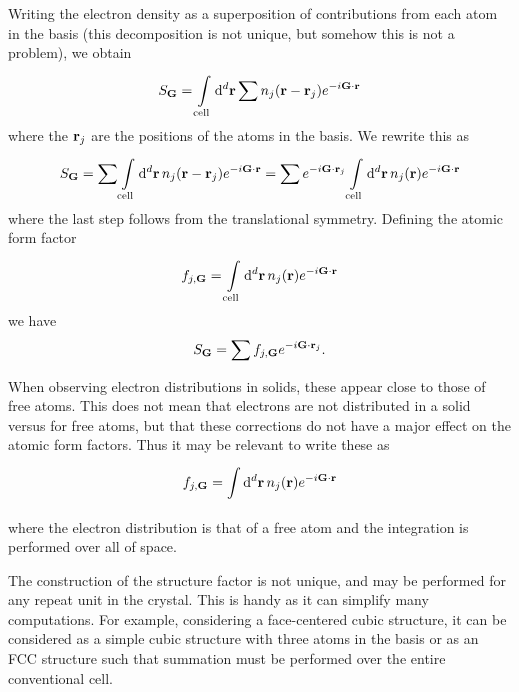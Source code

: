 Writing the electron density as a superposition of contributions from each atom in the basis (this decomposition is not unique, but somehow this is not a problem), we obtain
\begin{align*}
	S_{\vb{G}} = \integ[d]{\text{cell}}{}{\vb{r}}{\sum n_{j}(\vb{r} - \vb{r}_{j})e^{-i\vb{G}\cdot\vb{r}}}
\end{align*}
where the $\vb{r}_{j}$ are the positions of the atoms in the basis. We rewrite this as
\begin{align*}
	S_{\vb{G}} = \sum\integ[d]{\text{cell}}{}{\vb{r}}{n_{j}(\vb{r} - \vb{r}_{j})e^{-i\vb{G}\cdot\vb{r}}} = \sum e^{-i\vb{G}\cdot\vb{r}_{j}}\integ[d]{\text{cell}}{}{\vb{r}}{n_{j}(\vb{r})e^{-i\vb{G}\cdot\vb{r}}}
\end{align*}
where the last step follows from the translational symmetry. Defining the atomic form factor
\begin{align*}
	f_{j, \vb{G}} = \integ[d]{\text{cell}}{}{\vb{r}}{n_{j}(\vb{r})e^{-i\vb{G}\cdot\vb{r}}}
\end{align*}
we have
\begin{align*}
	S_{\vb{G}} = \sum f_{j, \vb{G}}e^{-i\vb{G}\cdot\vb{r}_{j}}.
\end{align*}

When observing electron distributions in solids, these appear close to those of free atoms. This does not mean that electrons are not distributed in a solid versus for free atoms, but that these corrections do not have a major effect on the atomic form factors. Thus it may be relevant to write these as
\begin{align*}
	f_{j, \vb{G}} = \integ[d]{}{}{\vb{r}}{n_{j}(\vb{r})e^{-i\vb{G}\cdot\vb{r}}}
\end{align*}
where the electron distribution is that of a free atom and the integration is performed over all of space.

The construction of the structure factor is not unique, and may be performed for any repeat unit in the crystal. This is handy as it can simplify many computations. For example, considering a face-centered cubic structure, it can be considered as a simple cubic structure with three atoms in the basis or as an FCC structure such that summation must be performed over the entire conventional cell.